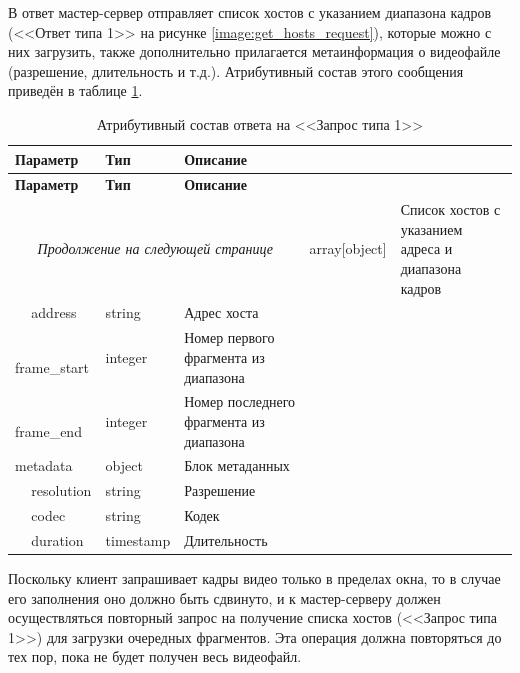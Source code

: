 В ответ мастер-сервер отправляет список хостов с указанием диапазона кадров (<<Ответ типа 1>> на рисунке \ref{image:get_hosts_request}), которые можно с них загрузить, также дополнительно прилагается метаинформация о видеофайле (разрешение, длительность и т.д.). Атрибутивный состав этого сообщения приведён в таблице \ref{tbl:get_hosts_response}. 

\begin{longtable}{|p{4cm}|p{3cm}|p{8.5cm}|}
	\caption{Атрибутивный состав ответа на <<Запрос типа 1>>}\label{tbl:get_hosts_response}\\
	\hline
	
	\textbf{Параметр} & \textbf{Тип} & \textbf{Описание}\\ 
	\hline
	\endfirsthead
	
	\hline
	\textbf{Параметр} & \textbf{Тип} & \textbf{Описание}\\ 
	\hline
	\endhead
	
	\hline
	\multicolumn{3}{c}{\textit{Продолжение на следующей странице}}
	\endfoot
	\hline
	\endlastfoot
	
	hosts & 
	array[object] & 
	Список хостов с указанием адреса и диапазона кадров \\
	
	\hline
	\,\,\,\,\,\,\,address & 
	string & 
	Адрес хоста \\
	
	\hline
	\,\,\,\,\,\,\,frame\_start & 
	integer & 
	Номер первого фрагмента из диапазона \\
	
	\hline
	\,\,\,\,\,\,\,frame\_end & 
	integer & 
	Номер последнего фрагмента из диапазона \\
	
	\hline
	metadata & 
	object & 
	Блок метаданных \\
	
	\hline
	\,\,\,\,\,\,\,resolution & 
	string & 
	Разрешение \\
	
	\hline
	\,\,\,\,\,\,\,codec & 
	string & 
	Кодек \\
	
	\hline
	\,\,\,\,\,\,\,duration & 
	timestamp & 
	Длительность \\
\end{longtable}

Поскольку клиент запрашивает кадры видео только в пределах окна, то в случае его заполнения оно должно быть сдвинуто, и к мастер-серверу должен осуществляться повторный запрос на получение списка хостов (<<Запрос типа 1>>) для загрузки очередных фрагментов. Эта операция должна повторяться до тех пор, пока не будет получен весь видеофайл.

